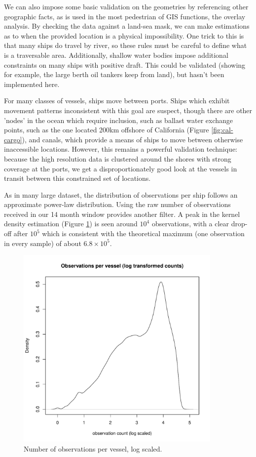 We can also impose some basic validation on the geometries by referencing other geographic facts, as is used in the most pedestrian of GIS functions, the overlay analysis. By checking the data against a land-sea mask, we can make estimations as to when the provided location is a physical impossibility. One trick to this is that many ships do travel by river, so these rules must be careful to define what is a traversable area. Additionally, shallow water bodies impose additional constraints on many ships with positive draft. This could be validated (showing for example, the large berth oil tankers keep from land), but hasn't been implemented here.

For many classes of vessels, ships move between ports. Ships which exhibit movement patterns inconsistent with this goal are suspect, though there are other 'nodes' in the ocean which require inclusion, such as ballast water exchange points, such as the one located 200km offshore of California (Figure \ref{fig:cal-cargo}), and canals, which provide a means of ships to move between otherwise inaccessible locations. However, this remains a powerful validation technique: because the high resolution data is clustered around the shores with strong coverage at the ports, we get a disproportionately good look at the vessels in transit between this constrained set of locations.

As in many large dataset, the distribution of observations per ship follows an approximate power-law distribution. Using the raw number of observations received in our 14 month window provides another filter. A peak in the kernel density estimation (Figure \ref{fig:obs-per-vessel-log}) is seen around $10^4$ observations, with a clear drop-off after $10^5$ which is consistent with the theoretical maximum (one observation in every sample) of about $6.8 \times 10^5$.

\begin{figure}[htbp]
  \centering
  \includegraphics[width=100mm]{figures/obs-per-vessel-log.pdf}
  \caption{Number of observations per vessel, log scaled.}
  \label{fig:obs-per-vessel-log}
\end{figure}


